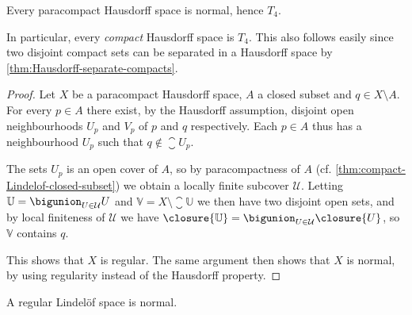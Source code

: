 \documentclass[article, a4paper, 11pt, oneside]{memoir}
\numberwithin{equation}{chapter}
\newcommand{\calU}{\mathcal{U}}
\begin{document}
\begin{proposition}
    \label{thm:paracompact-Hausdorff-is-normal}
    Every paracompact Hausdorff space is normal, hence $T_4$.
\end{proposition}
%
In particular, every \emph{compact} Hausdorff space is $T_4$. This also follows easily since two disjoint compact sets can be separated in a Hausdorff space by \cref{thm:Hausdorff-separate-compacts}.

\newcommand{\bbU}{\mathbb{U}}
\newcommand{\bbV}{\mathbb{V}}

\begin{proof}
    Let $X$ be a paracompact Hausdorff space, $A$ a closed subset and $q \in X \setminus A$. For every $p \in A$ there exist, by the Hausdorff assumption, disjoint open neighbourhoods $U_p$ and $V_p$ of $p$ and $q$ respectively. Each $p \in A$ thus has a neighbourhood $U_p$ such that $q \not\in \closure{U}_p$.
    
    The sets $U_p$ is an open cover of $A$, so by paracompactness of $A$ (cf. \cref{thm:compact-Lindelof-closed-subset}) we obtain a locally finite subcover $\calU$. Letting $\bbU = \bigunion_{U \in \calU} U$ and $\bbV = X \setminus \closure{\bbU}$ we then have two disjoint open sets, and by local finiteness of $\calU$ we have $\closure{\bbU} = \bigunion_{U \in \calU} \closure{U}$, so $\bbV$ contains $q$.

    This shows that $X$ is regular. The same argument then shows that $X$ is normal, by using regularity instead of the Hausdorff property.
\end{proof}


\begin{proposition}
    A regular Lindelöf space is normal.
\end{proposition}
\end{document}
